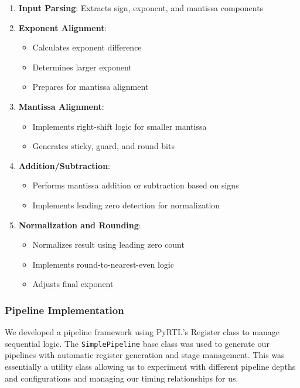 \documentclass[12pt,letterpaper]{article}
\begin{document}
\begin{enumerate}
    \item \textbf{Input Parsing}: Extracts sign, exponent, and mantissa components
    
    \item \textbf{Exponent Alignment}:
    \begin{itemize}
        \item Calculates exponent difference
        \item Determines larger exponent
        \item Prepares for mantissa alignment
    \end{itemize}
    
    \item \textbf{Mantissa Alignment}:
    \begin{itemize}
        \item Implements right-shift logic for smaller mantissa
        \item Generates sticky, guard, and round bits
    \end{itemize}
    
    \item \textbf{Addition/Subtraction}:
    \begin{itemize}
        \item Performs mantissa addition or subtraction based on signs
        \item Implements leading zero detection for normalization
    \end{itemize}
    
    \item \textbf{Normalization and Rounding}:
    \begin{itemize}
        \item Normalizes result using leading zero count
        \item Implements round-to-nearest-even logic
        \item Adjusts final exponent
    \end{itemize}
\end{enumerate}

\subsubsection{Pipeline Implementation}

We developed a pipeline framework using PyRTL's Register class to manage sequential logic. The \texttt{SimplePipeline} base class was used to generate our pipelines with automatic register generation and stage management. This was essentially a utility class allowing us to experiment with different pipeline depths and configurations and managing our timing relationships for us.
\end{document}
